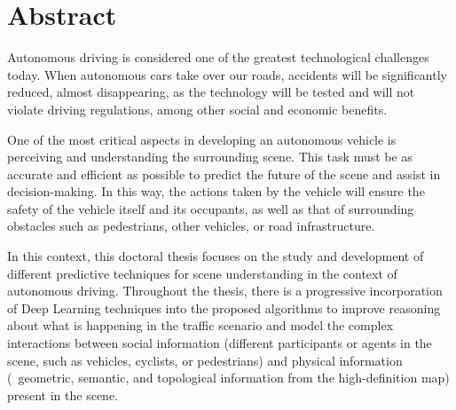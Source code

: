 %
%
%
% 
%
%
%
%

\chapter*{Abstract}
\label{cha:abstract}


Autonomous driving is considered one of the greatest technological challenges today. When autonomous cars take over our roads, accidents will be significantly reduced, almost disappearing, as the technology will be tested and will not violate driving regulations, among other social and economic benefits.

One of the most critical aspects in developing an autonomous vehicle is perceiving and understanding the surrounding scene. This task must be as accurate and efficient as possible to predict the future of the scene and assist in decision-making. In this way, the actions taken by the vehicle will ensure the safety of the vehicle itself and its occupants, as well as that of surrounding obstacles such as pedestrians, other vehicles, or road infrastructure.

In this context, this doctoral thesis focuses on the study and development of different predictive techniques for scene understanding in the context of autonomous driving. Throughout the thesis, there is a progressive incorporation of Deep Learning techniques into the proposed algorithms to improve reasoning about what is happening in the traffic scenario and model the complex interactions between social information (different participants or agents in the scene, such as vehicles, cyclists, or pedestrians) and physical information (\ie \ geometric, semantic, and topological information from the high-definition map) present in the scene.

